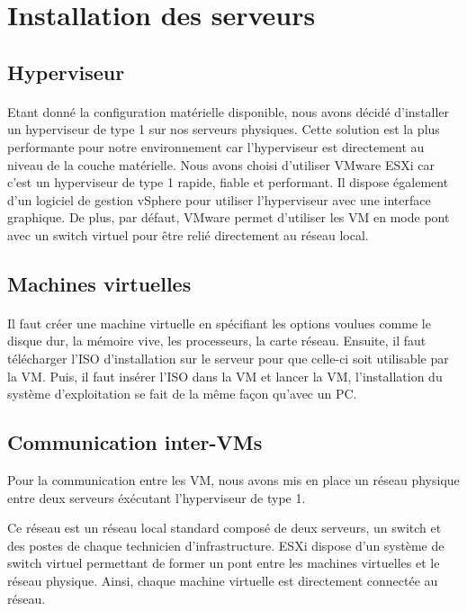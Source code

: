 \section{Installation des serveurs}
	\subsection{Hyperviseur}
		\paragraph{}
			Etant donné la configuration matérielle disponible, nous avons décidé d’installer un hyperviseur de type 1 sur nos serveurs physiques. Cette solution est la plus performante pour notre environnement car l’hyperviseur est directement au niveau de la couche matérielle. Nous avons choisi d’utiliser VMware ESXi car c’est un hyperviseur de type 1 rapide, fiable et performant. Il dispose également d’un logiciel de gestion vSphere pour utiliser l’hyperviseur avec une interface graphique. De plus, par défaut, VMware permet d’utiliser les VM en mode pont avec un switch virtuel pour être relié directement au réseau local.

	\subsection{Machines virtuelles}
		\paragraph{}
			Il faut créer une machine virtuelle en spécifiant les options voulues comme le disque dur, la mémoire vive, les processeurs, la carte réseau. Ensuite, il faut télécharger l’ISO d’installation sur le serveur pour que celle-ci soit utilisable par la VM. Puis, il faut insérer l’ISO dans la VM et lancer la VM, l’installation du système d’exploitation se fait de la même façon qu’avec un PC. 

	\subsection{Communication inter-VMs}

Pour la communication entre les VM, nous avons mis en place un réseau physique entre deux serveurs éxécutant l'hyperviseur de type 1.

Ce réseau est un réseau local standard composé de deux serveurs, un switch et des postes de chaque technicien d'infrastructure.
ESXi dispose d'un système de switch virtuel permettant de former un pont entre les machines virtuelles et le réseau physique.
Ainsi, chaque machine virtuelle est directement connectée au réseau.


